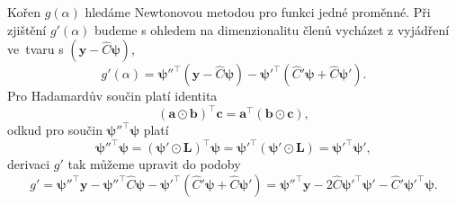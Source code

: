 Kořen $g(\alpha)$ hledáme Newtonovou metodou pro funkci jedné proměnné. Při zjištění $g'(\alpha)$ budeme s ohledem na dimenzionalitu členů vycházet z vyjádření ve~tvaru s $(\bm{y}-\hat{C}\bm{\psi})$,
\begin{equation}
    g'(\alpha)=\bm{\psi}''^\top(\bm{y}-\hat{C}\bm{\psi})-\bm{\psi}'^\top(\hat{C}'\bm{\psi}+\hat{C}\bm{\psi}').
\end{equation}
Pro Hadamardův součin platí identita
\begin{equation}
    (\bm{a}\odot\bm{b})^\top\bm{c}=\bm{a}^\top(\bm{b}\odot\bm{c}),
\end{equation}
odkud pro součin $\bm{\psi}''^\top\bm{\psi}$ platí
\begin{equation}
    \bm{\psi}''^\top\bm{\psi}=(\bm{\psi}'\odot\bm{L})^\top\bm{\psi}=\bm{\psi}'^\top(\bm{\psi}'\odot\bm{L})=\bm{\psi}'^\top\bm{\psi}',
\end{equation}
derivaci $g'$ tak můžeme upravit do podoby
\begin{equation}
    g'=\bm{\psi}''^\top\bm{y}-\bm{\psi}''^\top\hat{C}\bm{\psi}-\bm{\psi}'^\top(\hat{C}'\bm{\psi}+\hat{C}\bm{\psi}')
    =\bm{\psi}''^\top\bm{y}-2\hat{C}\bm{\psi}'^\top\bm{\psi}'-\hat{C}'\bm{\psi}'^\top\bm{\psi}.
\end{equation}

